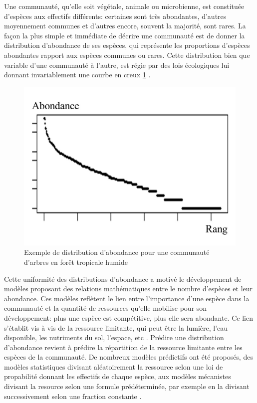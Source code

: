 \documentclass[
  11pt,
  french,
  A4paper,
  extrafontsizes,onecolumn,openright
  ]{memoir}
\begin{document}
Une communauté, qu'elle soit végétale, animale ou microbienne, est
constituée d'espèces aux effectifs différents: certaines sont très
abondantes, d'autres moyennement communes et d'autres encore, souvent la
majorité, sont rares. La façon la plus simple et immédiate de décrire
une communauté est de donner la distribution d'abondance de ses espèces,
qui représente les proportions d'espèces abondantes rapport aux espèces
communes ou rares. Cette distribution bien que variable d'une communauté
à l'autre, est régie par des lois écologiques lui donnant invariablement
une courbe en creux \ref{fig:AbdDist} \autocite{McGill2007}.

\begin{figure}

{\centering \includegraphics[width=0.6\linewidth]{ExternalFig/SpeciesAbdDist} 

}

\caption{Exemple de distribution d'abondance pour une communauté d'arbres en forêt tropicale humide}\label{fig:AbdDist}
\end{figure}

Cette uniformité des distributions d'abondance a motivé le développement
de modèles proposant des relations mathématiques entre le nombre
d'espèces et leur abondance. Ces modèles reflètent le lien entre
l'importance d'une espèce dans la communauté et la quantité de
ressources qu'elle mobilise pour son développement: plus une espèce est
compétitive, plus elle sera abondante. Ce lien s'établit vis à vis de la
ressource limitante, qui peut être la lumière, l'eau disponible, les
nutriments du sol, l'espace, etc
\autocites{Silvertown2004}{terSteege2006}. Prédire une distribution
d'abondance revient à prédire la répartition de la ressource limitante
entre les espèces de la communauté. De nombreux modèles prédictifs ont
été proposés, des modèles statistiques divisant aléatoirement la
ressource selon une loi de propabilité donnant les effectifs de chaque
espèce, aux modèles mécanistes divisant la resource selon une formule
prédéterminée, par exemple en la divisant successivement selon une
fraction constante
\autocites{Fisher1943}{Motomura1932}{Tokeshi1993}{Magurran1988}.
\end{document}
